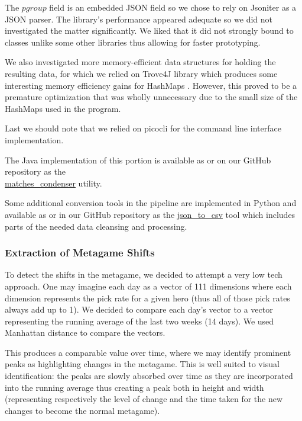 The $pgroup$ field is an embedded JSON field so we chose to rely on Jsoniter \cite{wenJsoniterJsoniterator2019} as a JSON parser. The library's performance appeared adequate so we did not investigated the matter significantly. We liked that it did not strongly bound to classes unlike some other libraries thus allowing for faster prototyping.

We also investigated more memory-efficient data structures for holding the resulting data, for which we relied on Trove4J \cite{edenGNUTroveTrove4j2013} library which produces some interesting memory efficiency gains for HashMaps \cite{vorontsovTroveLibraryUsing2014}. However, this proved to be a premature optimization that was wholly unnecessary due to the small size of the HashMaps used in the program.

Last we should note that we relied on picocli \cite{popmaPicocli2019} for the command line interface implementation.

The Java implementation of this portion is available as  or on our GitHub repository as the \\\href{https://github.com/marcolussetti/opendotadump-tools/tree/master/matches_condenser}{matches\_condenser} utility.

Some additional conversion tools in the pipeline are implemented in Python and available as  or in our GitHub repository as the \href{https://github.com/marcolussetti/opendotadump-tools/tree/master/json_to_csv}{json\_to\_csv} tool which includes parts of the needed data cleansing and processing.

\subsubsection{Extraction of Metagame Shifts} %

To detect the shifts in the metagame, we decided to attempt a very low tech approach. One may imagine each day as a vector of 111 dimensions where each dimension represents the pick rate for a given hero (thus all of those pick rates always add up to 1). We decided to compare each day's vector to a vector representing the running average of the last two weeks (14 days). We used Manhattan distance to compare the vectors.

This produces a comparable value over time, where we may identify prominent peaks as highlighting changes in the metagame. This is well suited to visual identification: the peaks are slowly absorbed over time as they are incorporated into the running average thus creating a peak both in height and width (representing respectively the level of change and the time taken for the new changes to become the normal metagame).

